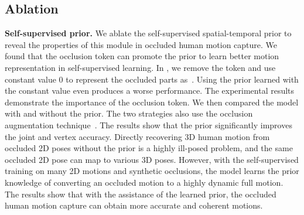 \subsection{Ablation}


\noindent\textbf{Self-supervised prior.}
We ablate the self-supervised spatial-temporal prior to reveal the properties of this module in occluded human motion capture. We found that the occlusion token can promote the prior to learn better motion representation in self-supervised learning. In , we remove the token and use constant value 0 to represent the occluded parts as~\cite{zhang2020object}. Using the prior learned with the constant value even produces a worse performance. The experimental results demonstrate the importance of the occlusion token. We then compared the model with and without the prior. The two strategies also use the occlusion augmentation technique~\cite{sarandi2018robust}. The results show that the prior significantly improves the joint and vertex accuracy. Directly recovering 3D human motion from occluded 2D poses without the prior is a highly ill-posed problem, and the same occluded 2D pose can map to various 3D poses. However, with the self-supervised training on many 2D motions and synthetic occlusions, the model learns the prior knowledge of converting an occluded motion to a highly dynamic full motion. The results show that with the assistance of the learned prior, the occluded human motion capture can obtain more accurate and coherent motions.

